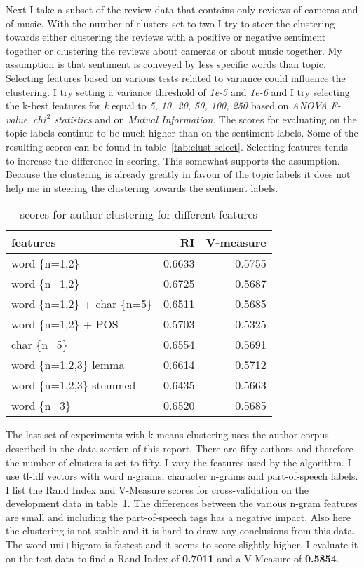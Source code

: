 \documentclass[11pt]{article}
\begin{document}
Next I take a subset of the review data that contains only reviews of cameras and of music. With the number of clusters set to two I try to steer the clustering towards either clustering the reviews with a positive or negative sentiment together or clustering the reviews about cameras or about music together. My assumption is that sentiment is conveyed by less specific words than topic. Selecting features based on various tests related to variance could influence the clustering. I try setting a variance threshold of \emph{1e-5} and \emph{1e-6} and I try selecting the k-best features for \emph{k} equal to \emph{5, 10, 20, 50, 100, 250} based on \emph{ANOVA F-value}, \emph{$chi^2$ statistics} and on \emph{Mutual Information}. The scores for evaluating on the topic labels continue to be much higher than on the sentiment labels. Some of the resulting scores can be found in table~\ref{tab:clust-select}. Selecting features tends to increase the difference in scoring. This somewhat supports the assumption. Because the clustering is already greatly in favour of the topic labels it does not help me in steering the clustering towards the sentiment labels.

\begin{table}[ht]\footnotesize
\centering
\caption{scores for author clustering for different features}
\label{tab:authors}
\begin{tabular}{ l r r }
features & RI & V-measure \\
\hline
word \{n=1,2\}            & 0.6633 & 0.5755 \\
word \{n=1,2\}            & 0.6725 & 0.5687 \\
word \{n=1,2\} + char \{n=5\} & 0.6511 & 0.5685 \\
word \{n=1,2\} + POS      & 0.5703 & 0.5325 \\
char \{n=5\}              & 0.6554 & 0.5691 \\
word \{n=1,2,3\} lemma    & 0.6614 & 0.5712 \\
word \{n=1,2,3\} stemmed  & 0.6435 & 0.5663 \\
word \{n=3\}              & 0.6520 & 0.5685 \\
\end{tabular}
\end{table}

The last set of experiments with k-means clustering uses the author corpus described in the data section of this report. There are fifty authors and therefore the number of clusters is set to fifty. I vary the features used by the algorithm. I use tf-idf vectors with word n-grams, character n-grams and part-of-speech labels. I list the Rand Index and V-Measure scores for cross-validation on the development data in table~\ref{tab:authors}. The differences between the various n-gram features are small and including the part-of-speech tags has a negative impact. Also here the clustering is not stable and it is hard to draw any conclusions from this data. The word uni+bigram is fastest and it seems to score slightly higher. I evaluate it on the test data to find a Rand Index of \textbf{0.7011} and a V-Measure of \textbf{0.5854}.
\end{document}
